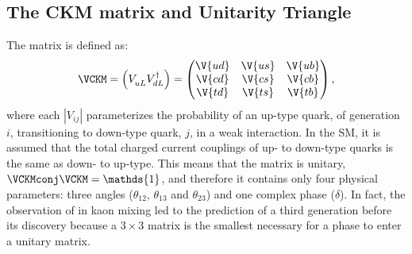 \subsection{The CKM matrix and Unitarity Triangle}
\label{sec:ckm}

The \ckm matrix is defined as:
\begin{equation}
  \VCKM = \left(V_{uL}^{\phantom{\dagger}} V_{dL}^\dagger\right) =
  \begin{pmatrix}
    \V{ud} & \V{us} & \V{ub} \\
    \V{cd} & \V{cs} & \V{cb} \\
    \V{td} & \V{ts} & \V{tb} \\
  \end{pmatrix},
\end{equation}
where each $|V_{ij}|$ parameterizes the probability of an up-type quark, of generation $i$,
transitioning to down-type quark, $j$, in a weak interaction.
In the SM, it is assumed that the total charged current couplings of up- to down-type quarks is the
same as down- to up-type.
This means that the \ckm matrix is unitary, $\VCKMconj\VCKM = \mathds{1}$, and therefore it contains
only four physical parameters: three angles ($\theta_{12}$, $\theta_{13}$ and $\theta_{23}$) and one
complex phase ($\delta$).
In fact, the observation of \CPV in kaon mixing led to the prediction of a third generation before
its discovery because a $3\times3$ matrix is the smallest necessary for a phase to enter a unitary
matrix.









